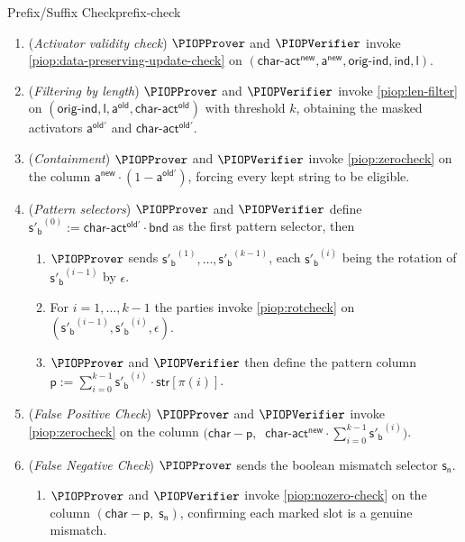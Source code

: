    \begin{DefinePIOP}{Prefix/Suffix Check}{prefix-check}
    \begin{enumerate}[nosep]
        \item (\textit{Activator validity check}) $\PIOPProver$ and $\PIOPVerifier$ invoke \cref{piop:data-preserving-update-check} on $(\mathsf{char\text{-}act^{new}}, \mathsf{a^{new}}, \mathsf{orig\text{-}ind}, \mathsf{ind}, \mathsf{l})$.
        \item (\textit{Filtering by length}) $\PIOPProver$ and $\PIOPVerifier$ invoke \cref{piop:len-filter} on $(\mathsf{orig\text{-}ind}, \mathsf{l}, \mathsf{a^{old}}, \mathsf{char\text{-}act^{old}})$ with threshold $k$, obtaining the masked activators $\mathsf{a^{old'}}$ and $\mathsf{char\text{-}act^{old'}}$.
        \item (\textit{Containment}) $\PIOPProver$ and $\PIOPVerifier$ invoke \cref{piop:zerocheck} on the column $\mathsf{a^{new}}\cdot(1-\mathsf{a^{old'}})$, forcing every kept string to be eligible.
        \item (\textit{Pattern selectors}) $\PIOPProver$ and $\PIOPVerifier$ define $\mathsf{s'_b}^{(0)} := \mathsf{char\text{-}act^{old'}}\cdot\mathsf{bnd}$ as the first pattern selector, then
       \begin{enumerate}[nosep]
        \item $\PIOPProver$ sends $\mathsf{s'_b}^{(1)},\ldots,\mathsf{s'_b}^{(k-1)}$, each $\mathsf{s'_b}^{(i)}$ being the rotation of $\mathsf{s'_b}^{(i-1)}$ by $\epsilon$.
        \item For $i=1,\ldots,k-1$ the parties invoke \cref{piop:rotcheck} on $(\mathsf{s'_b}^{(i-1)}, \mathsf{s'_b}^{(i)}, \epsilon)$. 
        \item $\PIOPProver$ and $\PIOPVerifier$ then define the pattern column $\mathsf{p} := \sum_{i=0}^{k-1}\mathsf{s'_b}^{(i)}\cdot\mathsf{str}[\pi(i)]$.
       \end{enumerate} 
        \item (\textit{False Positive Check}) $\PIOPProver$ and $\PIOPVerifier$ invoke \cref{piop:zerocheck} on the column $\bigl(\mathsf{char}-\mathsf{p},\;\;\mathsf{char\text{-}act^{new}}\cdot\textstyle\sum_{i=0}^{k-1}\mathsf{s'_b}^{(i)}\bigr)$.
        \item (\textit{False Negative Check}) $\PIOPProver$ sends the boolean mismatch selector $\mathsf{s_n}$.
        \begin{enumerate}[nosep]
          \item $\PIOPProver$ and $\PIOPVerifier$ invoke \cref{piop:nozero-check} on the column $(\mathsf{char}-\mathsf{p},\;\mathsf{s_n})$, confirming each marked slot is a genuine mismatch.

\end{enumerate}
\end{enumerate}
\end{DefinePIOP}
